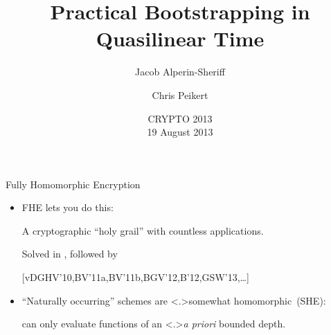 \documentclass[shadow,xcolor=pdftex,svgnames,table,t]{beamer}
\title
{ Practical Bootstrapping in\\Quasilinear Time
}
\author
{ {\Large Jacob Alperin-Sheriff}
  \and
  {\Large Chris Peikert}
}
\institute{School of Computer Science\\Georgia Tech}
\date
{
  CRYPTO 2013\\
  19 August 2013
}
\newcommand{\Green}[1]{{\color{Green}#1}}
\begin{document}
\setlength{\abovedisplayskip}{8pt plus 2pt minus 1pt}
\setlength{\belowdisplayskip}{8pt plus 2pt minus 0pt}
\setlength{\abovedisplayshortskip}{0pt plus 2pt}
\setlength{\belowdisplayshortskip}{8pt plus 2pt minus 1pt}

\begin{frame}[label=title]
  \titlepage
\end{frame}

\begin{frame}[label=fhe]{Fully Homomorphic Encryption {}}
  \begin{itemize}
  \item<+-> FHE lets you do this:
    \begin{center}
    \end{center}

    \medskip
    A cryptographic ``holy grail'' with countless applications.

    \medskip Solved in {\citationsize [Gentry'09]}, followed by

    \hfill
    {\scriptsize [vDGHV'10,BV'11a,BV'11b,BGV'12,B'12,GSW'13,\ldots]}
  \end{itemize}

  \onslide<+->
  \begin{itemize}
  \item ``Naturally occurring'' schemes are \alert<.>{somewhat
      homomorphic}~(SHE):

    can only evaluate functions of an \alert<.>{\textit{a priori}
      bounded} depth.
  \end{itemize}

  \begin{center}
\end{center}
\end{frame}
\end{document}
